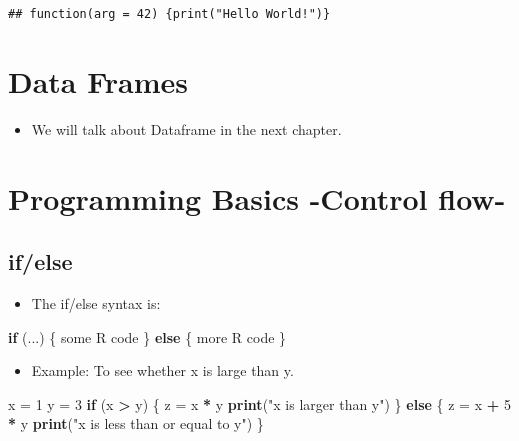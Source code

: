 \documentclass[]{book}
\newenvironment{Shaded}{\begin{snugshade}}{\end{snugshade}}
\newcommand{\ControlFlowTok}[1]{\textcolor[rgb]{0.13,0.29,0.53}{\textbf{#1}}}
\newcommand{\DecValTok}[1]{\textcolor[rgb]{0.00,0.00,0.81}{#1}}
\newcommand{\KeywordTok}[1]{\textcolor[rgb]{0.13,0.29,0.53}{\textbf{#1}}}
\newcommand{\NormalTok}[1]{#1}
\newcommand{\OperatorTok}[1]{\textcolor[rgb]{0.81,0.36,0.00}{\textbf{#1}}}
\newcommand{\StringTok}[1]{\textcolor[rgb]{0.31,0.60,0.02}{#1}}
\providecommand{\tightlist}{%
  \setlength{\itemsep}{0pt}\setlength{\parskip}{0pt}}
\begin{document}
\begin{verbatim}
## function(arg = 42) {print("Hello World!")}
\end{verbatim}

\hypertarget{data-frames}{%
\section{Data Frames}\label{data-frames}}

\begin{itemize}
\tightlist
\item
  We will talk about Dataframe in the next chapter.
\end{itemize}

\hypertarget{programming-basics--control-flow-}{%
\section{Programming Basics -Control flow-}\label{programming-basics--control-flow-}}

\hypertarget{ifelse}{%
\subsection{if/else}\label{ifelse}}

\begin{itemize}
\tightlist
\item
  The if/else syntax is:
\end{itemize}

\begin{Shaded}
\begin{Highlighting}[]
\ControlFlowTok{if}\NormalTok{ (...) \{}
\NormalTok{  some R code}
\NormalTok{\} }\ControlFlowTok{else}\NormalTok{ \{}
\NormalTok{  more R code}
\NormalTok{\}}
\end{Highlighting}
\end{Shaded}

\begin{itemize}
\tightlist
\item
  Example: To see whether x is large than y.
\end{itemize}

\begin{Shaded}
\begin{Highlighting}[]
\NormalTok{x =}\StringTok{ }\DecValTok{1}
\NormalTok{y =}\StringTok{ }\DecValTok{3}
\ControlFlowTok{if}\NormalTok{ (x }\OperatorTok{>}\StringTok{ }\NormalTok{y) \{}
\NormalTok{  z =}\StringTok{ }\NormalTok{x }\OperatorTok{*}\StringTok{ }\NormalTok{y}
  \KeywordTok{print}\NormalTok{(}\StringTok{"x is larger than y"}\NormalTok{)}
\NormalTok{\} }\ControlFlowTok{else}\NormalTok{ \{}
\NormalTok{  z =}\StringTok{ }\NormalTok{x }\OperatorTok{+}\StringTok{ }\DecValTok{5} \OperatorTok{*}\StringTok{ }\NormalTok{y}
  \KeywordTok{print}\NormalTok{(}\StringTok{"x is less than or equal to y"}\NormalTok{)}
\NormalTok{\}}
\end{Highlighting}
\end{Shaded}
\end{document}
